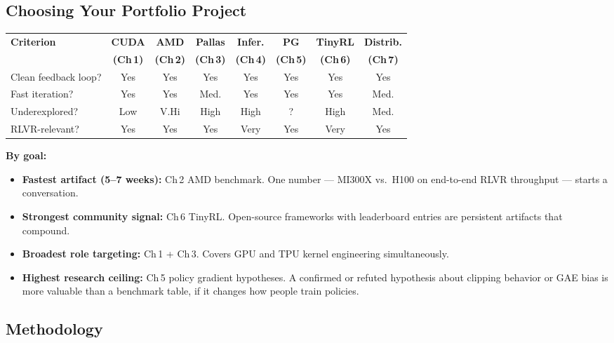 
\subsection{Choosing Your Portfolio Project}

\begin{table}[h]
\centering
\footnotesize
\setlength{\tabcolsep}{3pt}
\begin{tabular}{@{}lccccccc@{}}
\toprule
\textbf{Criterion} & \textbf{CUDA} & \textbf{AMD} & \textbf{Pallas} & \textbf{Infer.} & \textbf{PG} & \textbf{TinyRL} & \textbf{Distrib.} \\
 & \textbf{(Ch\,1)} & \textbf{(Ch\,2)} & \textbf{(Ch\,3)} & \textbf{(Ch\,4)} & \textbf{(Ch\,5)} & \textbf{(Ch\,6)} & \textbf{(Ch\,7)} \\
\midrule
Clean feedback loop?   & Yes  & Yes   & Yes    & Yes  & Yes     & Yes  & Yes  \\
Fast iteration?        & Yes  & Yes   & Med.   & Yes  & Yes     & Yes  & Med. \\
Underexplored?         & Low  & V.Hi  & High   & High & ?       & High & Med. \\
RLVR-relevant?         & Yes  & Yes   & Yes    & Very & Yes     & Very & Yes  \\
\bottomrule
\end{tabular}
\end{table}

\noindent\textbf{By goal:}
\begin{itemize}
  \item \textbf{Fastest artifact (5--7 weeks):} Ch\,2 AMD benchmark. One number --- MI300X vs.\ H100 on end-to-end RLVR throughput --- starts a conversation.
  \item \textbf{Strongest community signal:} Ch\,6 TinyRL. Open-source frameworks with leaderboard entries are persistent artifacts that compound.
  \item \textbf{Broadest role targeting:} Ch\,1 + Ch\,3. Covers GPU and TPU kernel engineering simultaneously.
  \item \textbf{Highest research ceiling:} Ch\,5 policy gradient hypotheses. A confirmed or refuted hypothesis about clipping behavior or GAE bias is more valuable than a benchmark table, if it changes how people train policies.
\end{itemize}


\subsection{Methodology}

